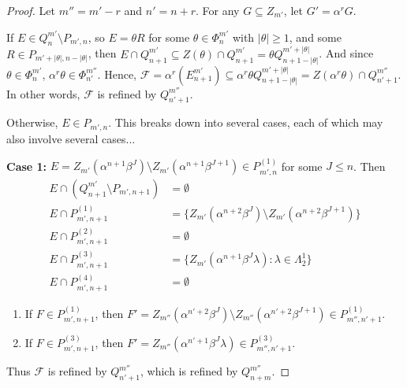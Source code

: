 \documentclass[10pt,a4paper]{amsart}
\newcommand{\La}{\Lambda}
\newcommand{\al}{\alpha}
\newcommand{\be}{\beta}
\newcommand{\emp}{\emptyset}
\newcommand{\la}{\lambda}
\newcommand{\mc}[1]{\mathcal{#1}}
\newcommand{\sm}{\setminus}
\newcommand{\sse}{\subseteq}
\renewcommand{\th}{\theta}
\begin{document}
\begin{proof}
    Let $m'' = m'-r$ and $n' = n+r$. For any $G \sse Z_{m'}$, let $G' = \al^r G$.
    
    If $E \in Q^{m'}_n \sm P_{m', n}$, so $E = \th R$ for some $\th \in \Phi_n^{m'}$ with $|\th| \ge 1$, and some $R \in P_{m'+|\th|, n-|\th|}$, then $E \cap Q_{n+1}^{m'} \sse Z(\th) \cap Q_{n+1}^{m'} = \th Q_{n+1 - |\th|}^{m'+|\th|}$. And since $\th \in \Phi_n^{m'}$, $\al^r \th \in \Phi_{n'}^{m''}$. Hence, $\mc{F} = \al^r (E^{m'}_{n+1}) \sse \al^r \th Q_{n+1 -|\th|}^{m'+|\th|} = Z(\al^r\th) \cap Q_{n'+1}^{m''}$. In other words, $\mc{F}$ is refined by $Q_{n'+1}^{m''}$.

    Otherwise, $E \in P_{m',n}$. This breaks down into several cases, each of which may also involve several cases...

    \textbf{Case 1:} $E = Z_{m'}(\al^{n+1}\be^J) \sm Z_{m'}(\al^{n+1}\be^{J+1}) \in P_{m',n}^{(1)}$ for some $J \leq n$. Then
    \begin{align*}
        E \cap (Q^{m'}_{n+1} \sm P_{m', n+1}) &= \emp\\
        E \cap P^{(1)}_{m',n+1} &= \{ Z_{m'}(\al^{n+2}\be^J) \sm Z_{m'}(\al^{n+2} \be^{J+1}) \}\\
        E \cap P^{(2)}_{m',n+1} &= \emp\\
        E \cap P^{(3)}_{m',n+1} &= \{ Z_{m'}(\al^{n+1}\be^J \la) : \la \in \La_2^1\} \\
        E \cap P^{(4)}_{m',n+1} &= \emp
    \end{align*}
    \begin{enumerate}
        \item If $F \in P^{(1)}_{m',n+1}$, then $F' = Z_{m''}(\al^{n'+2}\be^{J}) \sm Z_{m''}(\al^{n'+2}\be^{J+1}) \in P^{(1)}_{m'', n' + 1}$.

    \item If $F \in P^{(3)}_{m',n+1}$, then $F' = Z_{m''}(\al^{n'+1}\be^{J} \la) \in P^{(3)}_{m'', n' + 1}$.
    \end{enumerate}
    Thus $\mc{F}$ is refined by $Q^{m''}_{n'+1}$, which is refined by $Q^{m''}_{n+m}$.


\end{proof}
\end{document}
